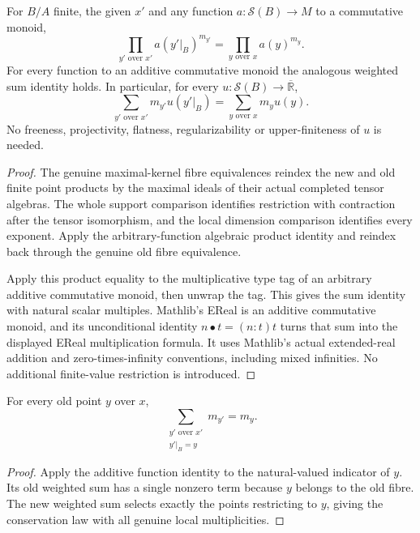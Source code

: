 \begin{theorem}
\label{spectrum:all-function-finite-base-change}
\leanok
{}
For $B/A$ finite, the given $x'$ and any function $a:\mathcal S(B)\to M$
to a commutative monoid,
\[
 \prod_{y'\text{ over }x'}a(y'|_B)^{m_{y'}}
 =\prod_{y\text{ over }x}a(y)^{m_y}.
\]
For every function to an additive commutative monoid the analogous weighted
sum identity holds. In particular, for every
$u:\mathcal S(B)\to\overline{\mathbb R}$,
\[
 \sum_{y'\text{ over }x'}m_{y'}u(y'|_B)
 =\sum_{y\text{ over }x}m_yu(y).
\]
No freeness, projectivity, flatness, regularizability or upper-finiteness
of $u$ is needed.
\end{theorem}
\begin{proof}
The genuine maximal-kernel fibre equivalences reindex the new and old
finite point products by the maximal ideals of their actual completed
tensor algebras. The whole support comparison identifies restriction with
contraction after the tensor isomorphism, and the local dimension comparison
identifies every exponent. Apply the arbitrary-function algebraic product
identity and reindex back through the genuine old fibre equivalence.

Apply this product equality to the multiplicative type tag of an arbitrary
additive commutative monoid, then unwrap the tag. This gives the sum identity
with natural scalar multiples. Mathlib's EReal is an additive commutative
monoid, and its unconditional identity $n\mathbin{\bullet}t=(n:t)t$ turns
that sum into the displayed EReal multiplication formula. It uses Mathlib's
actual extended-real addition and zero-times-infinity conventions, including
mixed infinities. No additional finite-value restriction is introduced.
\end{proof}

\begin{corollary}
\label{spectrum:finite-base-change-multiplicity-mass}
\leanok
{}
For every old point $y$ over $x$,
\[
 \sum_{\substack{y'\text{ over }x'\\y'|_B=y}}m_{y'}=m_y.
\]
\end{corollary}
\begin{proof}
Apply the additive function identity to the natural-valued indicator of
$y$. Its old weighted sum has a single nonzero term because $y$ belongs to
the old fibre. The new weighted sum selects exactly the points restricting
to $y$, giving the conservation law with all genuine local multiplicities.
\end{proof}
